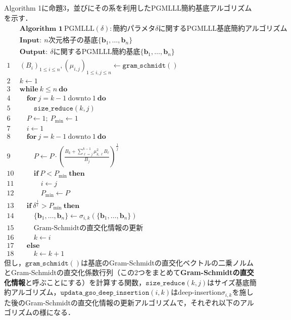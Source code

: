 \documentclass[a4j, dvipdfmx]{jsarticle}
\theoremstyle{definition}
\begin{document}
Algorithm 1に命題3，並びにその系を利用したPGMLLL簡約基底アルゴリズムを示す．
$$
\begin{array}{ll}
& \!\!\!\!\!\!\!\!\!\!\!\!\textbf{Algorithm~1}~\text{PGMLLL}(\delta): \text{簡約パラメタ}\delta\text{に関するPGMLLL基底簡約アルゴリズム}\\
& \!\!\!\!\!\!\!\!\!\!\!\!\textbf{Input}:~n\text{次元格子の基底}\{\boldsymbol{b}_1,\ldots,\boldsymbol{b}_n\}\\
& \!\!\!\!\!\!\!\!\!\!\!\!\textbf{Output}:~\delta\text{に関するPGMLLL簡約基底}\{\boldsymbol{b}_1,\ldots,\boldsymbol{b}_n\}\\
1 & (B_i)_{1\le i\le n}, (\mu_{i, j})_{1\le i, j\le n}\gets \texttt{gram\_schmidt}()\\
2 & k\gets 1\\
3 & \textbf{while}~k\le n~\textbf{do}\\
4 & \quad \textbf{for}~j=k-1~\text{downto}~1~\textbf{do}\\
5 & \quad\quad \texttt{size\_reduce}(k, j)\\
6 & \quad P\gets 1;~P_{\min}\gets 1\\
7 & \quad i\gets 1\\
8 & \quad \textbf{for}~j=k-1~\text{downto}~1~\textbf{do}\\
9 & \quad\quad P\gets P\cdot \left(\frac{B_k+\sum_{\ell=j}^{k-1}\mu_{k, \ell}^2B_\ell}{B_j}\right)^\frac{1}{j}\\
10 & \quad\quad \textbf{if}~P<P_{\min}~\textbf{then}\\
11 & \quad\quad\quad i\gets j\\
12 & \quad\quad\quad P_{\min}\gets P\\
13 & \quad \textbf{if}~\delta^{\frac{1}{i}} > P_{\min}~\textbf{then}\\
14 & \quad\quad \{\boldsymbol{b}_1,\ldots,\boldsymbol{b}_n\}\gets \sigma_{i, k}(\{\boldsymbol{b}_1,\ldots,\boldsymbol{b}_n\})\\
15 & \quad\quad \text{Gram-Schmidtの直交化情報の更新}\\
16 & \quad\quad k\gets i\\
17 & \quad \textbf{else}\\
18 & \quad\quad k\gets k+1
\end{array}
$$
但し，$\texttt{gram\_schmidt}()$は基底のGram-Schmidtの直交化ベクトルの二乗ノルムとGram-Schmidtの直交化係数行列（この$2$つをまとめて\textbf{Gram-Schmidtの直交化情報}と呼ぶことにする）を計算する関数，$\texttt{size\_reduce}(k, j)$はサイズ基底簡約アルゴリズム，$\texttt{updata\_gso\_deep\_insertion}(i, k)$はdeep-insertion$\sigma_{i, k}$を施した後のGram-Schmidtの直交化情報の更新アルゴリズムで，それぞれ以下のアルゴリズムの様になる．
\end{document}
